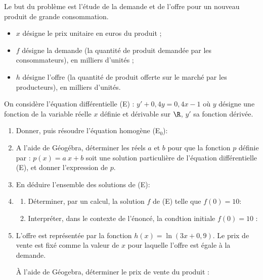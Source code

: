 \begin{exercice_cours}[\quad]{}

	Le but du problème est l’étude de la demande et de l’offre pour un nouveau produit
de grande consommation.

\begin{itemize}
	\item $x$ désigne le prix unitaire en euros du produit ;
	\item $f$ désigne la demande (la quantité de produit demandée par les consommateurs),
en milliers d’unités ;
	\item $h$ désigne l’offre (la quantité de produit offerte sur le marché par les producteurs),
en milliers d’unités.
\end{itemize}


	On considère l’équation différentielle (E) : $y' + 0,4 y = 0,4x-1$ où $y$ désigne une fonction de la variable réelle $x$ définie et dérivable sur $\R$, $y'$ sa fonction dérivée.

\begin{enumerate}
	\item Donner, puis résoudre l'équation homogène (E$_0$):   \hfill\reponseLigne[7cm]{}
	\item A l’aide de Géogébra, déterminer les réels $a$ et $b$ pour que la fonction $p$ définie par : $p(x) = a~x+b$ soit une solution particulière de l'équation différentielle (E), et donner l’expression de $p$. \par  \hfill\reponseLigne[7cm]{}
	\item En déduire l'ensemble des solutions de (E):    \hfill\reponseLigne[7cm]{}
	\item \begin{enumerate}
		\item Déterminer, par un calcul, la solution $f$ de (E) telle que $f(0)=10$:   
		\begin{blocvisiblex}[height=2]
{\quad}
\end{blocvisiblex}
\item Interpréter, dans le contexte de l'énoncé, la condtion initiale $f(0)=10$ :  
	\begin{blocvisiblex}[height=2]
{\quad}
\end{blocvisiblex}
\end{enumerate}
	\item L'offre est représentée par la fonction $h(x) = \ln(3x + 0, 9)$. Le prix de vente est fixé comme la valeur de $x$ pour laquelle l'offre est égale à la demande.
	
	À l'aide de Géogebra, déterminer le prix de vente du produit :  \hfill\reponseLigne[5cm]{}
	

\end{enumerate}
\end{exercice_cours}